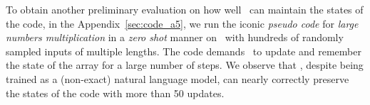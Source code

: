 To obtain another preliminary evaluation on how well \DV\ can maintain the states of the code, in the Appendix~\ref{sec:code_a5}, we run the iconic \textit{pseudo code} for \textit{large numbers multiplication} in a \textit{zero shot} manner on \DV\ with hundreds of randomly sampled inputs of multiple lengths. The code demands \DV\ to update and remember the state of the array for a large number of steps. We observe that \DV, despite being trained as a (non-exact) natural language model, can nearly correctly preserve the states of the code with more than 50 updates.










